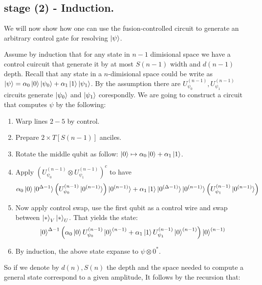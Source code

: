 \documentclass[manuscript,screen,review]{acmart}
\begin{document}

\subsection{stage (2) - Induction.}

We will now show how one can use the fusion-controlled circuit to generate an arbitrary control gate for resolving $\ket{\psi}$. 

Assume by induction that for any state in $n-1$ dimisional space we have a control cuircuit that generate it by at most $S(n-1)$ width and $d(n-1)$ depth. Recall that any state in a $n$-dimisional space could be write as $\ket{\psi} = \alpha_{0} \ket{0}\ket{ \psi_{0}} + \alpha_{1} \ket{1}\ket{ \psi_{1}} $. By the assumption there are $U_{\psi_{0}}^{(n-1)},U_{\psi_{1}}^{(n-1)}$ circuits generate $\ket{\psi_{0}}$ and $\ket{\psi_{1}}$ corespondly. We are going to construct a circuit that computes $\psi$ by the following: 
\begin{enumerate}
  \item Warp lines $2-5$ by control. 
  \item Prepare $2 \times T[S(n-1)]$ anciles.  
  \item Rotate the middle qubit as follow: $ \ket{0} \mapsto \alpha_{0} \ket{0} + \alpha_{1} \ket{1}$.   
  \item Apply $\left(U_{\psi_{0}}^{(n-1)} \otimes U_{\psi_{1}}^{(n-1)}\right)^{c} $ to have 
    \begin{equation*}
      \alpha_{0} \ket{0} \ket{0^{\Delta -1}} \left( U_{\psi_{0}}^{(n-1)} \ket{0^{(n-1)}} \right)\ket{0^{(n-1)}} + \alpha_{1} \ket{1} \ket{ 0^{(\Delta - 1)}} \ket{0^{(n-1)}} \left(U_{\psi_{1}}^{(n-1)}\ket{0^{(n-1)}}\right)
    \end{equation*}
  \item Now apply control swap, use the first qubit as a control wire and swap between $\ket{*}_{V}\ket{*}_{U} $. That yields the state: 
    \begin{equation*} \ket{0}^{\Delta -1} \left(\alpha_{0} \ket{0} U_{\psi_{0}}^{(n-1)} \ket{0}^{(n-1)} + \alpha_{1} \ket{1} U_{\psi_{1}}^{(n-1)}\ket{0}^{(n-1)} \right)\ket{0}^{(n-1)} 
    \end{equation*}
\item By induction, the above state expanse to $\psi \otimes 0^{*}$.
\end{enumerate}
So if we denote by $d(n), S(n)$ the depth and the space needed to compute a general state correspond to a given amplitude, It follows by the recursion that: 
\end{document}
